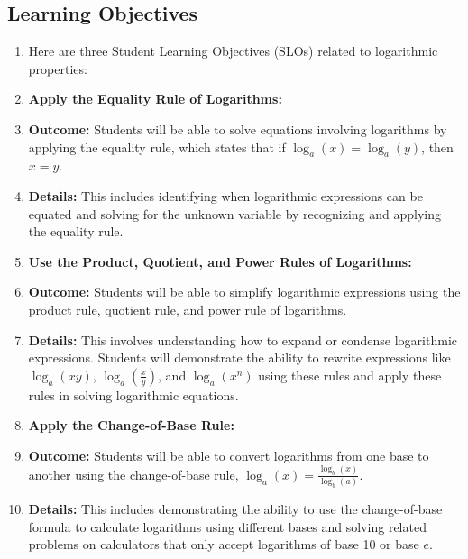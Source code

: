 \subsection{Learning Objectives}
\label{ssec:lear-fe6e}


\begin{enumerate}
    \item Here are three Student Learning Objectives (SLOs) related to logarithmic properties:
    \item \textbf{Apply the Equality Rule of Logarithms:}
    \item \textbf{Outcome:} Students will be able to solve equations involving logarithms by applying the equality rule, which states that if $ \log _a(x) = \log _a(y) $, then $ x = y $.
    \item \textbf{Details:} This includes identifying when logarithmic expressions can be equated and solving for the unknown variable by recognizing and applying the equality rule.
    \item \textbf{Use the Product, Quotient, and Power Rules of Logarithms:}
    \item \textbf{Outcome:} Students will be able to simplify logarithmic expressions using the product rule, quotient rule, and power rule of logarithms.
    \item \textbf{Details:} This involves understanding how to expand or condense logarithmic expressions. Students will demonstrate the ability to rewrite expressions like $ \log _a(xy) $, $ \log _a\left(\frac{x}{y}\right) $, and $ \log _a(x^n) $ using these rules and apply these rules in solving logarithmic equations.
    \item \textbf{Apply the Change-of-Base Rule:}
    \item \textbf{Outcome:} Students will be able to convert logarithms from one base to another using the change-of-base rule, $ \log _a(x) = \frac{\log _b(x)}{\log _b(a)} $.
    \item \textbf{Details:} This includes demonstrating the ability to use the change-of-base formula to calculate logarithms using different bases and solving related problems on calculators that only accept logarithms of base 10 or base $ e $.
\end{enumerate}


